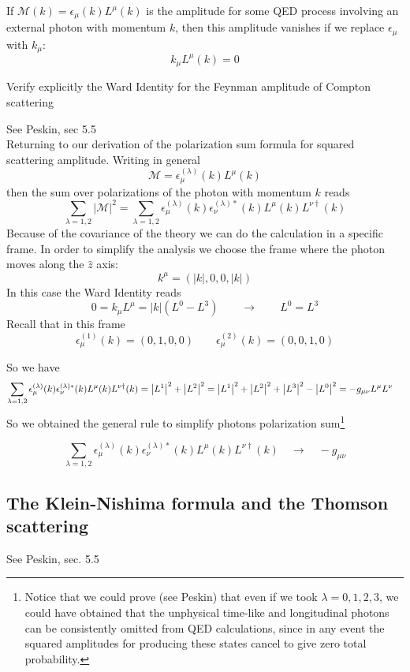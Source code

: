 \documentclass[TheoreticalPhy_ModB.tex]{subfiles}
\begin{document}
\begin{mdframed}[style=mybox]
If $\mathcal M(k)=\epsilon_\mu(k)L^\mu(k)$ is the amplitude for some QED process involving an external photon with momentum $k$, then this amplitude vanishes if we replace $\epsilon_\mu$ with $k_\mu$:
\[k_\mu L^\mu(k)=0\]
\end{mdframed}

\begin{exercise}
Verify explicitly the Ward Identity for the Feynman amplitude of Compton scattering
\end{exercise}

\textsf{See Peskin, sec 5.5}\\
Returning to our derivation of the polarization sum formula for squared scattering amplitude. Writing in general
\[\mathcal M=\epsilon_\mu^{(\lambda)}(k)L^\mu(k)\]
then the sum over polarizations of the photon with momentum $k$ reads
\[\sum_{\lambda=1,2}|\mathcal M|^2=\sum_{\lambda=1,2}\epsilon_\mu^{(\lambda)}(k)\epsilon_\nu^{(\lambda)*}(k)L^\mu(k)L^{\nu\dagger}(k)\]
Because of the covariance of the theory we can do the calculation in a specific frame. In order to simplify the analysis we choose the frame where the photon moves along the $\hat z$ axis:
\[k^\mu=(|k|,0,0,|k|)\]
In this case the Ward Identity reads
\[0=k_\mu L^\mu=|k|\left(L^0-L^3\right)\qquad\longrightarrow\qquad L^0=L^3\]
Recall that in this frame
\[\epsilon_\mu^{(1)}(k)=(0,1,0,0)\qquad\epsilon_\mu^{(2)}(k)=(0,0,1,0)\]

So we have
\begin{align*}\sum_{\lambda=1,2}\epsilon_\mu^{(\lambda)}(k)\epsilon_\nu^{(\lambda)*}(k)L^\mu(k)L^{\nu\dagger}(k)&=\abs{L^1}^2+\abs{L^2}^2=\abs{L^1}^2+\abs{L^2}^2+\abs{L^3}^2-\abs{L^0}^2=-g_{\mu\nu}L^\mu L^\nu
\end{align*}
So we obtained the general rule to simplify photons polarization sum\footnote{Notice that we could prove (see Peskin) that even if we took $\lambda=0,1,2,3$, we could have obtained that the unphysical time-like and longitudinal photons can be consistently omitted from QED calculations, since in any event the squared amplitudes for producing these states cancel to give zero total probability. }

\[
\boxed{
	\sum_{\lambda=1,2}\epsilon_\mu^{(\lambda)}(k)\epsilon_\nu^{(\lambda)*}(k)L^\mu(k)L^{\nu\dagger}(k)\quad\longrightarrow\quad-g_{\mu\nu}
}
\]




\subsection{The Klein-Nishima formula and the Thomson scattering}
\textsf{See Peskin, sec. 5.5}\\
\end{document}
